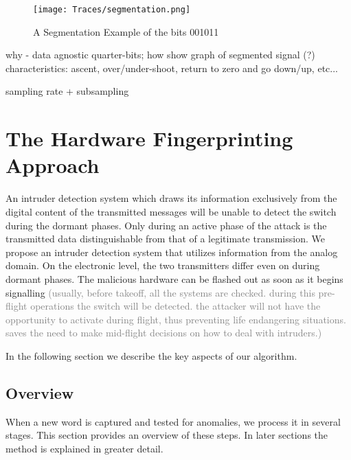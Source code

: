 \documentclass[conference]{IEEEtran}
\begin{document}
  \begin{figure}[t]
    \centering
    \texttt{[image: Traces/segmentation.png]}
    \caption{A Segmentation Example of the bits 001011}
    \label{fig:SegmentationTrace}
  \end{figure}
  
  \color{gray}
  why - data agnostic
  quarter-bits; how
  show graph of segmented signal (?)
  characteristics: ascent, over/under-shoot, return to zero and go down/up,
  etc...

  sampling rate + subsampling
  \color{black}
  
\section{The Hardware Fingerprinting Approach}
  An intruder detection system which draws its information exclusively from the digital content of the transmitted messages will be unable to detect the switch during the dormant phases. Only during an active phase of the attack is the transmitted data distinguishable from that of a legitimate transmission. We propose an intruder detection system that utilizes information from the analog domain. On the electronic level, the two transmitters differ even on during dormant phases. The malicious hardware can be flashed out as soon as it begins signalling \textcolor{gray}{(usually, before takeoff, all the systems are checked. during this pre-flight operations the switch will be detected. the attacker will not have the opportunity to activate during flight, thus preventing life endangering situations. saves the need to make mid-flight decisions on how to deal with intruders.)}
  
  In the following section we describe the key aspects of our algorithm.

\subsection{Overview} \label{Overview}
  When a new word is captured and tested for anomalies, we process it in several stages. This section provides an overview of these steps. In later sections the method is explained in greater detail.
  
\end{document}
